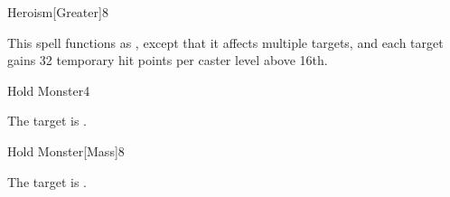 \begin{spellsection}{Heroism}[Greater]{8}
\begin{spellheader}
\end{spellheader}
\begin{spellcontent}
    \begin{spelltargetinginfo}
    \end{spelltargetinginfo}
    \begin{spelleffects}
        \spellspecial This spell functions as , except that it affects multiple targets, and each target gains 32 temporary hit points  per caster level above 16th.
    \end{spelleffects}
\end{spellcontent}
\begin{spellfooter}
\end{spellfooter}
\end{spellsection}

\begin{spellsection}{Hold Monster}{4}
\begin{spellheader}
\end{spellheader}
\begin{spellcontent}
    \begin{spelltargetinginfo}
    \end{spelltargetinginfo}
    \begin{spelleffects}
        \spelleffect The target is \immobilized.
        \spelldur \durshort
    \end{spelleffects}
\end{spellcontent}
\begin{spellfooter}
\end{spellfooter}
\end{spellsection}

\begin{spellsection}{Hold Monster}[Mass]{8}
\begin{spellheader}
\end{spellheader}
\begin{spellcontent}
    \begin{spelltargetinginfo}
    \end{spelltargetinginfo}
    \begin{spelleffects}
        \spelleffect The target is \immobilized.
        \spelldur \durshort
    \end{spelleffects}
\end{spellcontent}
\begin{spellfooter}
\end{spellfooter}
\end{spellsection}

